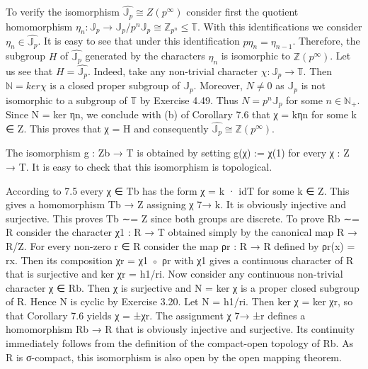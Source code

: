 \documentclass[12pt]{article}
\begin{document}
    To verify the isomorphism $\hat{\mathbb{J}_p} \cong Z(p^{\infty})$ consider first the quotient homomorphism $\eta_n : \mathbb{J}_p \to \mathbb{J}_p / p^n \mathbb{J}_p\cong \mathbb{Z}_{p^n} \leq \mathbb{T}$.
With this identifications we consider $\eta_n \in \hat{\mathbb{J}_p}$. It is easy to see that under this identification $p\eta_n = \eta_{n-1}$.
Therefore, the subgroup $H$ of $\hat{\mathbb{J}_p}$ generated by the characters $\eta_n$ is isomorphic to $\mathbb{Z}(p^\infty)$. Let us see that $H = \hat{\mathbb{J}_p}$.
Indeed, take any non-trivial character $\chi : \mathbb{J}_p \to \mathbb{T}$. Then $\mathbb{N} = ker \chi$ is a closed proper subgroup of $\mathbb{J}_p$. Moreover,
$N \neq 0$ as $\mathbb{J}_p$ is not isomorphic to a subgroup of $\mathbb{T}$ by Exercise 4.49. Thus $N = p^n \mathbb{J}_p$ for some $n \in \mathbb{N}_+$. Since
N = ker ηn, we conclude with (b) of Corollary 7.6 that χ = kηn for some k ∈ Z. This proves that χ = H and
consequently $\hat{\mathbb{J}_p} \cong \mathbb{Z}(p^{\infty})$.


    The isomorphism g : Zb → T is obtained by setting g(χ) := χ(1) for every χ : Z → T. It is easy to check that
this isomorphism is topological.


    According to 7.5 every χ ∈ Tb has the form χ = k · idT for some k ∈ Z. This gives a homomorphism Tb → Z
assigning χ 7→ k. It is obviously injective and surjective. This proves Tb ∼= Z since both groups are discrete.
To prove Rb ∼= R consider the character χ1 : R → T obtained simply by the canonical map R → R/Z. For
every non-zero r ∈ R consider the map ρr : R → R defined by ρr(x) = rx. Then its composition χr = χ1 ◦ ρr
with χ1 gives a continuous character of R that is surjective and ker χr = h1/ri. Now consider any continuous
non-trivial character χ ∈ Rb. Then χ is surjective and N = ker χ is a proper closed subgroup of R. Hence N
is cyclic by Exercise 3.20. Let N = h1/ri. Then ker χ = ker χr, so that Corollary 7.6 yields χ = ±χr. The
assignment χ 7→ ±r defines a homomorphism Rb → R that is obviously injective and surjective. Its continuity
immediately follows from the definition of the compact-open topology of Rb. As R is σ-compact, this isomorphism
is also open by the open mapping theorem.





















\maketitle
\end{document}
